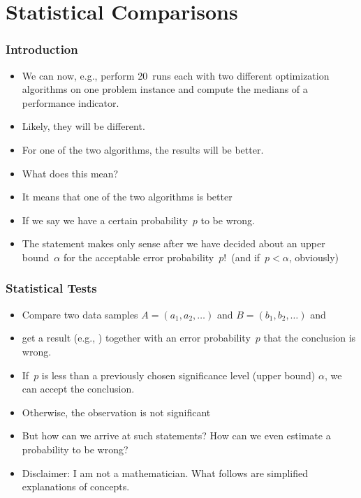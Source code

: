 \documentclass[aspectratio=169,mathserif,notheorems]{beamer}%
\begin{document}
\section{Statistical Comparisons}%
%
\begin{frame}\frametitle{Introduction}%
%
\begin{itemize}%
%
\item We can now, e.g., perform 20~runs each with two different optimization algorithms on one problem instance and compute the medians of a performance indicator.%
%
\item<2-> Likely, they will be different.%
%
\item<3-> For one of the two algorithms, the results will be better.%
%
\item<4-> \alert{What does this mean?}%
%
\item<5-> It means that one of the two algorithms is better%
%
\item<7-> If we say \emph{} we have a certain probability~$p$ to be wrong.%
%
\item<8-> \alert{The statement \emph{} makes only sense after we have decided about an upper bound~$\alpha$ for the acceptable error probability~$p$!}~(and if~$p<\alpha$, obviously)%
%
\end{itemize}%
%
\end{frame}%
%
\begin{frame}\frametitle{Statistical Tests}%
%
\begin{itemize}%
%
\item Compare two data samples $A=(a_1,a_2,\dots)$ and $B=(b_1,b_2,\dots)$ and%
%
\item<2-> get a result (e.g., \emph{}) \alert{together with} an error probability~$p$ that the conclusion is wrong.%
%
\item<3-> If~$p$ is less than a \alert{previously chosen} significance level (upper bound) \ensuremath{\alpha}, we can accept the conclusion.%
%
\item<4-> Otherwise, the observation is not significant%
%
\item<6-> But how can we arrive at such statements? How can we even estimate a probability to be wrong?%
%
\item<7-> \alert{Disclaimer: I am not a mathematician. What follows are simplified explanations of concepts.}%
%
\end{itemize}%
%
\end{frame}%
%
\end{document}
